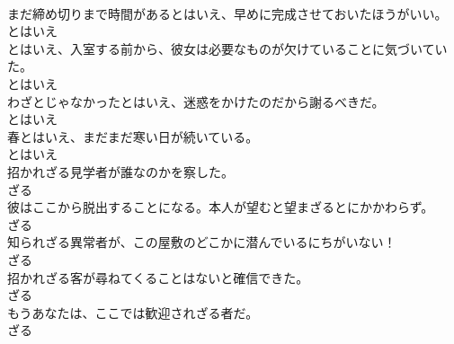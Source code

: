 \documentclass[8pt]{extreport}
\begin{document}
\begin{CJK}{UTF8}{min}
\\	まだ締め切りまで時間があるとはいえ、早めに完成させておいたほうがいい。	
\\	とはいえ
\\	とはいえ、入室する前から、彼女は必要なものが欠けていることに気づいていた。	
\\	とはいえ
\\	わざとじゃなかったとはいえ、迷惑をかけたのだから謝るべきだ。	
\\	とはいえ
\\	春とはいえ、まだまだ寒い日が続いている。	
\\	とはいえ
\\	招かれざる見学者が誰なのかを察した。	
\\	ざる
\\	彼はここから脱出することになる。本人が望むと望まざるとにかかわらず。	
\\	ざる
\\	知られざる異常者が、この屋敷のどこかに潜んでいるにちがいない！	
\\	ざる
\\	招かれざる客が尋ねてくることはないと確信できた。	
\\	ざる
\\	もうあなたは、ここでは歓迎されざる者だ。	
\\	ざる
\end{CJK}
\end{document}
